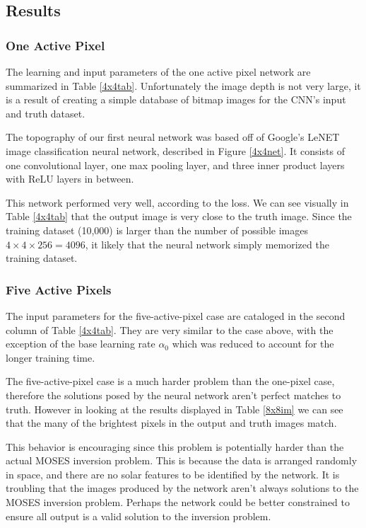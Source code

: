 \documentclass[twoside]{article}
\begin{document}
\begin{multicols}{2}
\subsection{Results}
\subsubsection{One Active Pixel}
The learning and input parameters of the one active pixel network are summarized in Table \ref{4x4tab}. Unfortunately the image depth is not very large, it is a result of creating a simple database of bitmap images for the CNN's input and truth dataset. \par The topography of our first neural network was based off of Google's LeNET image classification neural network, described in Figure \ref{4x4net}. It consists of one convolutional layer, one max pooling layer, and three inner product layers with ReLU layers in between. \par This network performed very well, according to the loss. We can see visually in Table \ref{4x4tab} that the output image is very close to the truth image. Since the training dataset (10,000) is larger than the number of possible images $4 \times 4 \times 256 = 4096$, it likely that the neural network simply memorized the training dataset.

\subsubsection{Five Active Pixels}

The input parameters for the five-active-pixel case are cataloged in the second column of Table \ref{4x4tab}.  They are very similar to the case above, with the exception of the base learning rate $\alpha_0$ which was reduced to account for the longer training time. \par The five-active-pixel case is a much harder problem than the one-pixel case, therefore the solutions posed by the neural network aren't perfect matches to truth. However in looking at the results displayed in Table \ref{8x8im} we can see that the many of the brightest pixels in the output and truth images match. \par This behavior is encouraging since this problem is potentially harder than the actual MOSES inversion problem. This is because the data is arranged randomly in space, and there are no solar features to be identified by the network. It is troubling that the images produced by the network aren't always solutions to the MOSES inversion problem. Perhaps the network could be better constrained to ensure all output is a valid solution to the inversion problem.


\end{multicols}
\end{document}
